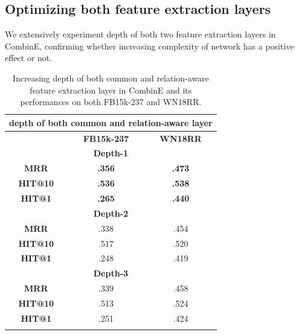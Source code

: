 \begin{table}[h]
\caption{Increasing width of common feature extraction layer and its performances on both FB15k-237 and WN18RR.}
\label{table12}
\end{table}

\newpage

\subsection{Optimizing both feature extraction layers}
We extensively experiment depth of both two feature extraction layers in CombinE, confirming whether increasing complexity of network has a positive effect or not.
\begin{table}[h]
\centering
\begin{tabular}{c|c|c}
\hline
\multicolumn{3}{c}{\textbf{depth of both common and relation-aware layer}}\\
\hline
 & \textbf{FB15k-237} & \textbf{WN18RR}\\
 \hline
  \multicolumn{3}{c}{\textbf{Depth-1}}\\
 \textbf{MRR} & \textbf{.356} & \textbf{.473} \\
 \textbf{HIT@10} & \textbf{.536} & \textbf{.538} \\
 \textbf{HIT@1} & \textbf{.265} & \textbf{.440} \\
 \hline
   \multicolumn{3}{c}{\textbf{Depth-2}}\\
 \textbf{MRR} & .338 & .454 \\
 \textbf{HIT@10} & .517 & .520 \\
 \textbf{HIT@1} & .248 & .419 \\
 \hline
   \multicolumn{3}{c}{\textbf{Depth-3}}\\
 \textbf{MRR} & .339 & .458 \\
 \textbf{HIT@10} & .513 & .524 \\
 \textbf{HIT@1} & .251 & .424 \\
\hline
\label{table12}
\end{tabular}

\caption{Increasing depth of both common and relation-aware feature extraction layer in CombinE and its performances on both FB15k-237 and WN18RR.}
\label{table13}
\end{table}